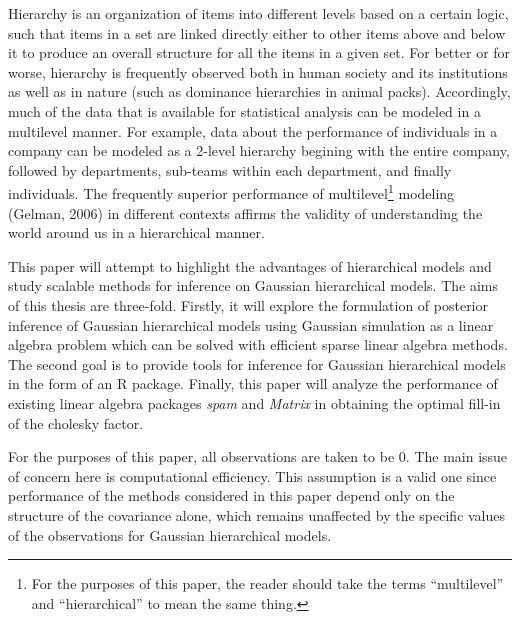 \documentclass[]{article}
\let\rmarkdownfootnote\footnote%
\def\footnote{\protect\rmarkdownfootnote}
\begin{document}
\newpage

 \newline

Hierarchy is an organization of items into different levels based on a
certain logic, such that items in a set are linked directly either to
other items above and below it to produce an overall structure for all
the items in a given set. For better or for worse, hierarchy is
frequently observed both in human society and its institutions as well
as in nature (such as dominance hierarchies in animal packs).
Accordingly, much of the data that is available for statistical analysis
can be modeled in a multilevel manner. For example, data about the
performance of individuals in a company can be modeled as a 2-level
hierarchy begining with the entire company, followed by departments,
sub-teams within each department, and finally individuals. The
frequently superior performance of multilevel\footnote{For the purposes
  of this paper, the reader should take the terms ``multilevel'' and
  ``hierarchical'' to mean the same thing.} modeling (Gelman, 2006) in
different contexts affirms the validity of understanding the world
around us in a hierarchical manner.

This paper will attempt to highlight the advantages of hierarchical
models and study scalable methods for inference on Gaussian hierarchical
models. The aims of this thesis are three-fold. Firstly, it will explore
the formulation of posterior inference of Gaussian hierarchical models
using Gaussian simulation as a linear algebra problem which can be
solved with efficient sparse linear algebra methods. The second goal is
to provide tools for inference for Gaussian hierarchical models in the
form of an R package. Finally, this paper will analyze the performance
of existing linear algebra packages \emph{spam} and \emph{Matrix} in
obtaining the optimal fill-in of the cholesky factor.

For the purposes of this paper, all observations are taken to be 0. The
main issue of concern here is computational efficiency. This assumption
is a valid one since performance of the methods considered in this paper
depend only on the structure of the covariance alone, which remains
unaffected by the specific values of the observations for Gaussian
hierarchical models. \newline \newline \newline

 \newline
\end{document}

